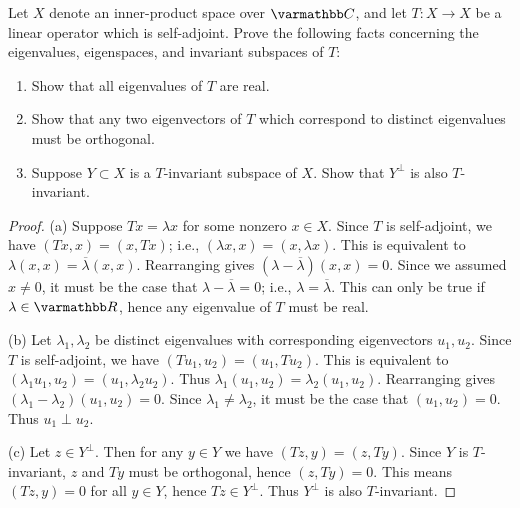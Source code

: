 \documentclass[10pt,oneside,openany]{memoir}
\begin{document}
\begin{exercise}[manual-num={7}]
Let $X$ denote an inner-product space over $\bfC$, and let $T:X \rightarrow X$ be a linear operator which is self-adjoint. Prove the following facts concerning the eigenvalues, eigenspaces, and invariant subspaces of $T$:
    \begin{enumerate}[label = (\alph*),itemsep=1pt,topsep=3pt]
        \item Show that all eigenvalues of $T$ are real.
        \item Show that any two eigenvectors of $T$ which correspond to distinct eigenvalues must be orthogonal.
        \item Suppose $Y \subset X$ is a $T$-invariant subspace of $X$. Show that $Y^\perp$ is also $T$-invariant.
    \end{enumerate}
\end{exercise}
    \begin{proof}
        (a) Suppose $Tx = \lambda x$ for some nonzero $x \in X$. Since $T$ is self-adjoint, we have $(Tx,x) = (x,Tx)$; i.e., $(\lambda x , x) = (x , \lambda x)$. This is equivalent to $\lambda (x,x) = \overline{\lambda}(x,x)$. Rearranging gives $(\lambda - \overline{\lambda})(x,x) = 0$. Since we assumed $x\neq 0$, it must be the case that $\lambda - \overline{\lambda} = 0$; i.e., $\lambda = \overline{\lambda}$. This can only be true if $\lambda \in \bfR$, hence any eigenvalue of $T$ must be real.

        (b) Let $\lambda_1,\lambda_2$ be distinct eigenvalues with corresponding eigenvectors $u_1,u_2$. Since $T$ is self-adjoint, we have $(Tu_1,u_2) = (u_1,Tu_2)$. This is equivalent to $(\lambda_1 u_1,u_2) = (u_1,\lambda_2 u_2)$. Thus $\lambda_1(u_1,u_2) = \lambda_2(u_1,u_2)$. Rearranging gives $(\lambda_1 - \lambda_2)(u_1,u_2) = 0$. Since $\lambda_1 \neq \lambda_2$, it must be the case that $(u_1,u_2) = 0$. Thus $u_1 \perp u_2$.

        (c) Let $z \in Y^\perp$. Then for any $y \in Y$ we have $(Tz,y) = (z,Ty)$. Since $Y$ is $T$-invariant, $z$ and $Ty$ must be orthogonal, hence $(z,Ty) = 0$. This means $(Tz,y) = 0$ for all $y \in Y$, hence $Tz \in Y^\perp$. Thus $Y^\perp$ is also $T$-invariant.
    \end{proof}
\end{document}
